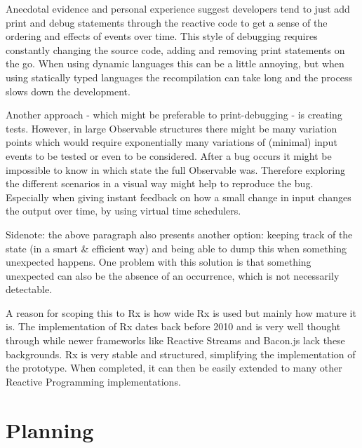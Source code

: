 \documentclass[11pt,a4paper]{article}
\begin{document}
Anecdotal evidence and personal experience suggest developers tend to just add print and debug statements through the reactive code to get a sense of the ordering and effects of events over time. This style of debugging requires constantly changing the source code, adding and removing print statements on the go. When using dynamic languages this can be a little annoying, but when using statically typed languages the recompilation can take long and the process slows down the development.

Another approach - which might be preferable to print-debugging - is creating tests. However, in large Observable structures there might be many variation points which would require exponentially many variations of (minimal) input events to be tested or even to be considered. After a bug occurs it might be impossible to know in which state the full Observable was. Therefore exploring the different scenarios in a visual way might help to reproduce the bug. Especially when giving instant feedback on how a small change in input changes the output over time, by using virtual time schedulers. 

Sidenote: the above paragraph also presents another option: keeping track of the state (in a smart \& efficient way) and being able to dump this when something unexpected happens. One problem with this solution is that something unexpected can also be the absence of an occurrence, which is not necessarily detectable.

A reason for scoping this to Rx is how wide Rx is used but mainly how mature it is. The implementation of Rx dates back before 2010 and is very well thought through while newer frameworks like Reactive Streams and Bacon.js lack these backgrounds. Rx is very stable and structured, simplifying the implementation of the prototype. When completed, it can then be easily extended to many other Reactive Programming implementations.

\section{Planning}
\end{document}
